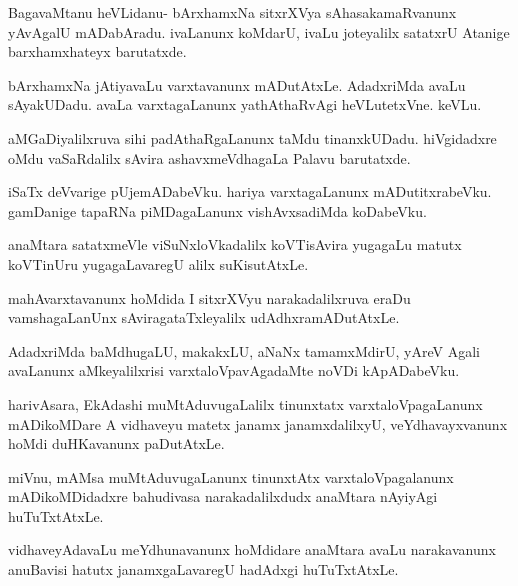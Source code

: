 \documentclass{article}
\begin{document}
\begin{mng}%
BagavaMtanu heVLidanu- bArxhamxNa sitxrXVya sAhasakamaRvanunx
yAvAgalU mADabAradu. ivaLanunx koMdarU, ivaLu joteyalilx
satatxrU Atanige barxhamxhateyx barutatxde.
\end{mng}

\begin{mng}%
bArxhamxNa jAtiyavaLu varxtavanunx mADutAtxLe. AdadxriMda
avaLu sAyakUDadu. avaLa varxtagaLanunx yathAthaRvAgi heVLutetxVne. keVLu.
\end{mng}

\begin{mng}%
aMGaDiyalilxruva sihi padAthaRgaLanunx taMdu tinanxkUDadu.
hiVgidadxre oMdu vaSaRdalilx sAvira ashavxmeVdhagaLa Palavu barutatxde.
\end{mng}

\begin{mng}%
iSaTx deVvarige pUjemADabeVku. hariya varxtagaLanunx mADutitxrabeVku.
gamDanige tapaRNa piMDagaLanunx vishAvxsadiMda koDabeVku.
\end{mng}

\begin{mng}%
anaMtara satatxmeVle viSuNxloVkadalilx koVTisAvira yugagaLu
matutx koVTinUru yugagaLavaregU alilx suKisutAtxLe.
\end{mng}

\begin{mng}%
mahAvarxtavanunx hoMdida I sitxrXVyu narakadalilxruva eraDu
vamshagaLanUnx sAviragataTxleyalilx udAdhxramADutAtxLe.
\end{mng}

\begin{mng}%
AdadxriMda baMdhugaLU, makakxLU, aNaNx tamamxMdirU, yAreV
Agali avaLanunx aMkeyalilxrisi varxtaloVpavAgadaMte noVDi kApADabeVku.
\end{mng}

\begin{mng}%
harivAsara, EkAdashi muMtAduvugaLalilx tinunxtatx varxtaloVpagaLanunx
mADikoMDare A vidhaveyu matetx janamx janamxdalilxyU, veYdhavayxvanunx
hoMdi duHKavanunx paDutAtxLe.
\end{mng}

\begin{mng}%
miVnu, mAMsa muMtAduvugaLanunx tinunxtAtx varxtaloVpagalanunx 
mADikoMDidadxre bahudivasa narakadalilxdudx anaMtara nAyiyAgi
huTuTxtAtxLe.
\end{mng}

\begin{mng}%
vidhaveyAdavaLu meYdhunavanunx hoMdidare anaMtara avaLu
narakavanunx anuBavisi hatutx janamxgaLavaregU hadAdxgi huTuTxtAtxLe.
\end{mng}
\end{document}
